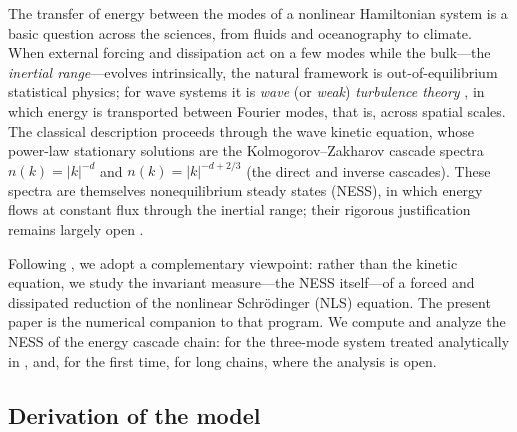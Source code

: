 \documentclass[11pt,a4paper]{article}
\theoremstyle{definition}
\numberwithin{equation}{section}   %
\begin{document}
The transfer of energy between the modes of a nonlinear Hamiltonian system is a
basic question across the sciences, from fluids and oceanography to climate.
When external forcing and dissipation act on a few modes while the bulk---the
\emph{inertial range}---evolves intrinsically, the natural framework is
out-of-equilibrium statistical physics; for wave systems it is \emph{wave} (or
\emph{weak}) \emph{turbulence theory} \cite{Nazarenko}, in which energy is
transported between Fourier modes, that is, across spatial scales. The classical
description proceeds through the wave kinetic equation, whose power-law
stationary solutions are the Kolmogorov--Zakharov cascade spectra
$n(k)=|k|^{-d}$ and $n(k)=|k|^{-d+2/3}$ (the direct and inverse cascades). These
spectra are themselves nonequilibrium steady states (NESS), in which energy
flows at constant flux through the inertial range; their rigorous justification
remains largely open \cite{HLNS}.

Following \cite{HLNS}, we adopt a complementary viewpoint: rather than the
kinetic equation, we study the invariant measure---the NESS itself---of a
forced and dissipated reduction of the nonlinear Schr\"odinger (NLS) equation.
The present paper is the numerical companion to that program. We compute and
analyze the NESS of the energy cascade chain: for the three-mode system treated
analytically in \cite{HLNS}, and, for the first time, for long chains, where the
analysis is open.

\subsection{Derivation of the model}\label{sec:derivation}
\end{document}
